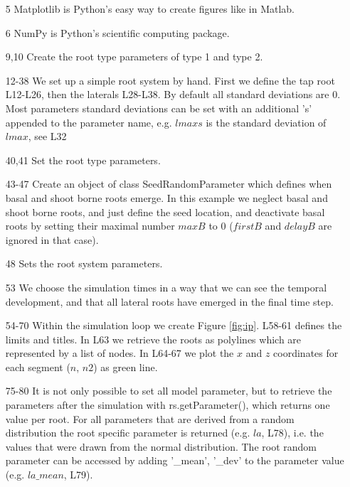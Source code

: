 \begin{itemize}
\item[5] Matplotlib is Python's easy way to create figures like in Matlab.\item[6] NumPy is Python's scientific computing package.

\item[9,10] Create the root type parameters of type 1 and type 2.
\item[12-38] We set up a simple root system by hand. First we define the tap root L12-L26, then the laterals L28-L38. By default all standard deviations are 0. Most parameters standard deviations can be set with an additional 's' appended to the parameter name, e.g. $lmaxs$ is the standard deviation of $lmax$, see L32
\item[40,41] Set the root type parameters.

\item[43-47] Create an object of class SeedRandomParameter which defines when basal and shoot borne roots emerge. In this example we neglect basal and shoot borne roots, and just define the seed location, and deactivate basal roots by setting their maximal number $maxB$ to 0 ($firstB$ and $delayB$ are ignored in that case). 
\item[48] Sets the root system parameters.

\item[53] We choose the simulation times in a way that we can see the temporal development, and that all lateral roots have emerged in the final time step.

\item[54-70] Within the simulation loop we create Figure \ref{fig:ip}. L58-61 defines the limits and titles. In L63 we retrieve the roots as polylines which are represented by a list of nodes. In L64-67 we plot the $x$ and $z$ coordinates for each segment ($n$, $n2$) as green line. 

\item[75-80] It is not only possible to set all model parameter, 
but to retrieve the parameters after the simulation with rs.getParameter(), which returns one value per root. For all parameters that are derived from a random distribution the root specific parameter is returned (e.g. $la$, L78), i.e. the values that were drawn from the normal distribution. The root random parameter can be accessed by adding '\_mean', '\_dev' to the parameter value (e.g. $la\_mean$, L79).

\end{itemize}

